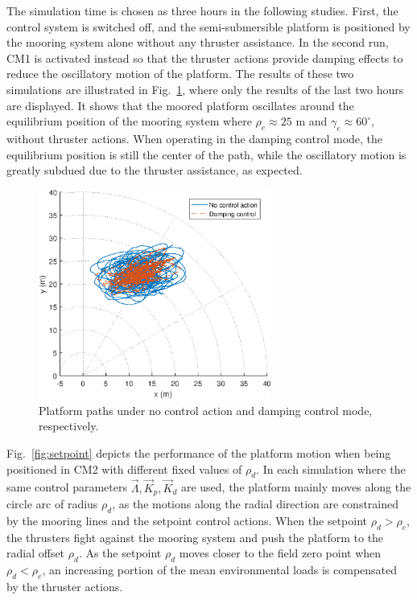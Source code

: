 \begin{sloppypar}
The simulation time is chosen as three hours in the following studies. First, the control system is switched off, and the semi-submersible platform is positioned by the mooring system alone without any thruster assistance. In the second run, CM1 is activated instead so that the thruster actions provide damping effects to reduce the oscillatory motion of the platform. The results of these two simulations are illustrated in Fig.~\ref{fig:mooring_damping}, where only the results of the last two hours are displayed. It shows that the moored platform oscillates around the equilibrium position of the mooring system where $\rho_e \approx 25$ m and $\gamma_e \approx 60^\circ$, without thruster actions. When operating in the damping control mode, the equilibrium position is still the center of the path, while the oscillatory motion is greatly subdued due to the thruster assistance, as expected.

\begin{figure}[htbp]
	\centering
	\includegraphics[width=3.0in]{Images/mooring_damping.eps}
	\caption{Platform paths under no control action and damping control mode, respectively.}
	\label{fig:mooring_damping}
\end{figure}

Fig.~\ref{fig:setpoint} depicts the performance of the platform motion when being positioned in CM2 with different fixed values of $\rho_d$.  In each simulation where the same control parameters $\vec{\Lambda}, \vec{K}_p, \vec{K}_d$ are used, the platform mainly moves along the circle arc of radius $\rho_d$, as the motions along the radial direction are constrained by the mooring lines and the setpoint control actions. When the setpoint $\rho_d > \rho_e$, the thrusters fight against the mooring system and push the platform to the radial offset $\rho_d$. As the setpoint $\rho_d$ moves closer to the field zero point when $\rho_d < \rho_e$, an increasing portion of the mean environmental loads is compensated by the thruster actions. 


\end{sloppypar}
